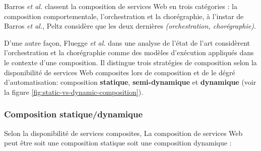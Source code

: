     Barros \emph{et al.} \cite{barros2006standards} classent la
    composition de services Web en trois catégories : la composition
    comportementale, l'orchestration et la chorégraphie, à l'instar de
    Barros \emph{et al.}, Peltz \cite{peltz2003web} considère que les
    deux dernières \textit{(orchestration, chorégraphie)}.

    

    D'une autre façon, Fluegge \emph{et
      al.}\cite{fluegge2006challenges} dans une analyse de l'état de
    l'art considèrent l'orchestration et la chorégraphie comme des
    modèles d'exécution appliqués dans le contexte d'une
    composition. Il distingue trois stratégies de composition selon la
    disponibilité de services Web composites lors de composition et
    de le dégré d'automatisation: composition \textbf{statique},
    \textbf{semi-dynamique} et \textbf{dynamique} (voir la
    figure \ref{fig:static-vs-dynamic-composition}).

    


      \subsubsection{Composition statique/dynamique}
      \label{sec:comp-stat}
      Selon la disponibilité de services composites, La composition
      de services Web peut être soit une composition statique soit
      une composition dynamique \cite{driss2011approche}:

